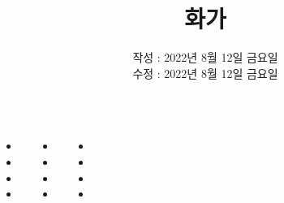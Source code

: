 \documentclass[	20pt, 
							a0paper, 
							landscape, %
							margin=0mm, %
							innermargin=4mm,  		%
							blockverticalspace=4mm, %
							colspace=5mm, 
							subcolspace=0mm
							]{tikzposter}
\title{ 화가 }
\author{ 	작성 : 2022년 8월 12일 금요일\\
			수정 : 2022년 8월 12일 금요일 }
\begin{document}
	\maketitle[
					width=841mm,
					linewidth = 2mm,
					innersep=4mm,
					titletextscale =4, 
				]




	\begin{columns}


			{
				\begin{LARGE}
					\begin{itemize}
					\item 
					\item 
					\item 
					\item 
					\end{itemize}
				\end{LARGE}
			}




			{
				\begin{LARGE}
					\begin{itemize}
					\item 
					\item 
					\item 
					\item 
					\end{itemize}
				\end{LARGE}
			}




			{
				\begin{LARGE}
					\begin{itemize}
					\item 
					\item 
					\item 
					\item 
					\end{itemize}
				\end{LARGE}
			}



\end{columns}
\end{document}
